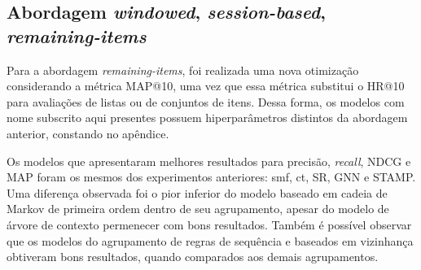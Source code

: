 \subsection{Abordagem \textit{windowed}, \textit{session-based}, \textit{remaining-items}}
Para a abordagem \textit{remaining-items}, foi realizada uma nova otimização
considerando a métrica MAP@10, uma vez que essa métrica substitui o HR@10 para
avaliações de listas ou de conjuntos de itens. Dessa forma, os modelos com nome subscrito aqui presentes possuem hiperparâmetros
distintos da abordagem anterior, constando no apêndice.

Os modelos que apresentaram melhores resultados para precisão, \textit{recall},
NDCG e MAP foram os mesmos dos experimentos anteriores: smf, ct, SR, GNN e
STAMP. Uma diferença observada foi o pior inferior do modelo baseado em cadeia
de Markov de primeira ordem dentro de seu agrupamento, apesar do modelo de árvore de contexto permenecer
com bons resultados. Também é possível observar que os modelos do agrupamento
de regras de sequência e baseados em vizinhança obtiveram bons resultados, quando
comparados aos demais agrupamentos.


